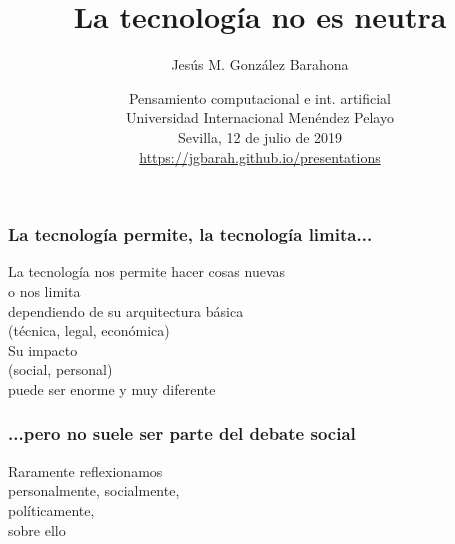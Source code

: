 \documentclass[17pt,aspectratio=169]{beamer}
\begin{document}
\title{La tecnología no es neutra}
\author{Jesús M. González Barahona}

\date{Pensamiento computacional e int. artificial \\
  Universidad Internacional Menéndez Pelayo \\
  Sevilla, 12 de julio de 2019\\
{\small \url{https://jgbarah.github.io/presentations}} \\}

\frame{
\maketitle
}





\begin{frame}
\frametitle{La tecnología permite, la tecnología limita...}

\begin{flushright}
La tecnología nos permite hacer cosas nuevas \\
o nos limita \\
dependiendo de su arquitectura básica \\
(técnica, legal, económica) \\
\vspace{.5cm}
Su impacto \\
(social, personal) \\
puede ser enorme y muy diferente \\
\end{flushright}

\end{frame}


\begin{frame}
\frametitle{...pero no suele ser parte del debate social}

\begin{center}
{\Large
Raramente reflexionamos\\
personalmente, socialmente, \\
políticamente, \\
sobre ello \\
}
\end{center}

\end{frame}
\end{document}
